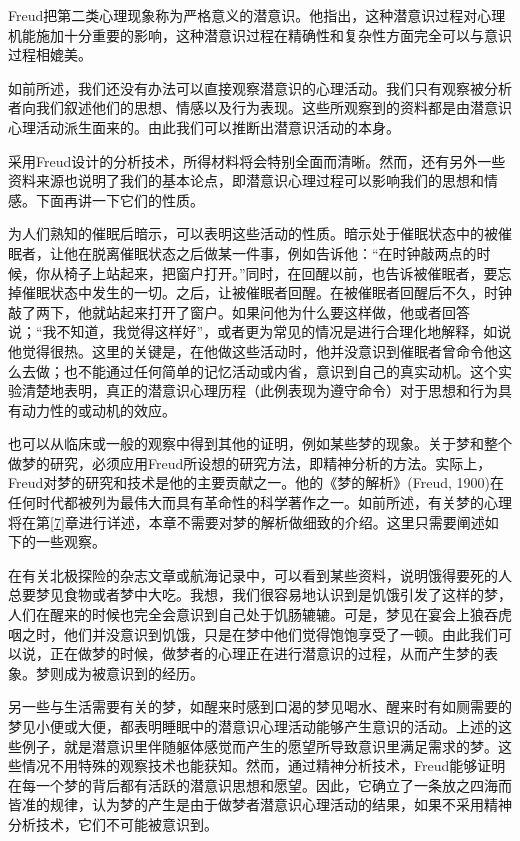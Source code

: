 \documentclass[UTF8,10pt,a4paper,openany]{book}
\begin{document}
Freud把第二类心理现象称为严格意义的潜意识。他指出，这种潜意识过程对心理机能施加十分重要的影响，这种潜意识过程在精确性和复杂性方面完全可以与意识过程相媲美。

如前所述，我们还没有办法可以直接观察潜意识的心理活动。我们只有观察被分析者向我们叙述他们的思想、情感以及行为表现。这些所观察到的资料都是由潜意识心理活动派生面来的。由此我们可以推断出潜意识活动的本身。

采用Freud设计的分析技术，所得材料将会特别全面而清晰。然而，还有另外一些资料来源也说明了我们的基本论点，即潜意识心理过程可以影响我们的思想和情感。下面再讲一下它们的性质。

为人们熟知的催眠后暗示，可以表明这些活动的性质。暗示处于催眠状态中的被催眠者，让他在脱离催眠状态之后做某一件事，例如告诉他：“在时钟敲两点的时候，你从椅子上站起来，把窗户打开。”同时，在回醒以前，也告诉被催眠者，要忘掉催眠状态中发生的一切。之后，让被催眠者回醒。在被催眠者回醒后不久，时钟敲了两下，他就站起来打开了窗户。如果问他为什么要这样做，他或者回答说；“我不知道，我觉得这样好”，或者更为常见的情况是进行合理化地解释，如说他觉得很热。这里的关键是，在他做这些活动时，他并没意识到催眠者曾命令他这么去做；也不能通过任何简单的记忆活动或内省，意识到自己的真实动机。这个实验清楚地表明，真正的潜意识心理历程（此例表现为遵守命令）对于思想和行为具有动力性的或动机的效应。

也可以从临床或一般的观察中得到其他的证明，例如某些梦的现象。关于梦和整个做梦的研究，必须应用Freud所设想的研究方法，即精神分析的方法。实际上，Freud对梦的研究和技术是他的主要贡献之一。他的《梦的解析》(Freud, 1900)在任何时代都被列为最伟大而具有革命性的科学著作之一。如前所述，有关梦的心理将在第\ref{7}章进行详述，本章不需要对梦的解析做细致的介绍。这里只需要阐述如下的一些观察。

在有关北极探险的杂志文章或航海记录中，可以看到某些资料，说明饿得要死的人总要梦见食物或者梦中大吃。我想，我们很容易地认识到是饥饿引发了这样的梦，人们在醒来的时候也完全会意识到自己处于饥肠辘辘。可是，梦见在宴会上狼吞虎咽之时，他们并没意识到饥饿，只是在梦中他们觉得饱饱享受了一顿。由此我们可以说，正在做梦的时候，做梦者的心理正在进行潜意识的过程，从而产生梦的表象。梦则成为被意识到的经历。

另一些与生活需要有关的梦，如醒来时感到口渴的梦见喝水、醒来时有如厕需要的梦见小便或大便，都表明睡眠中的潜意识心理活动能够产生意识的活动。上述的这些例子，就是潜意识里伴随躯体感觉而产生的愿望所导致意识里满足需求的梦。这些情况不用特殊的观察技术也能获知。然而，通过精神分析技术，Freud能够证明在每一个梦的背后都有活跃的潜意识思想和愿望。因此，它确立了一条放之四海而皆准的规律，认为梦的产生是由于做梦者潜意识心理活动的结果，如果不采用精神分析技术，它们不可能被意识到。
\end{document}

